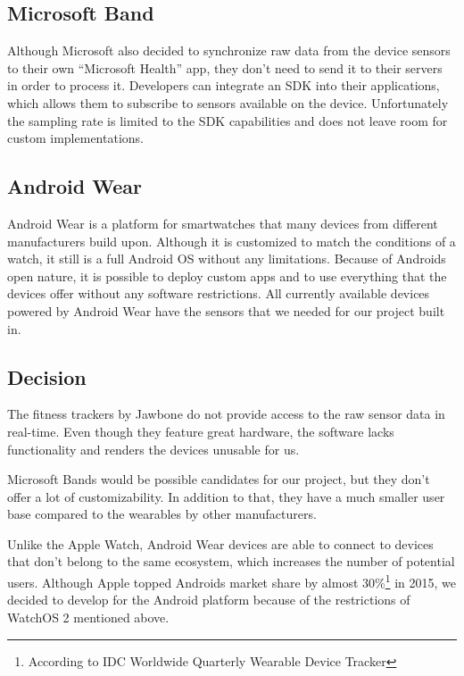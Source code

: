 \subsection{Microsoft Band}
Although Microsoft also decided to synchronize raw data from the device sensors to their own ``Microsoft Health'' app, they don't need to send it to their servers in order to process it.
Developers can integrate an SDK into their applications, which allows them to subscribe to sensors available on the device.
Unfortunately the sampling rate is limited to the SDK capabilities and does not leave room for custom implementations.

\clearpage

\subsection{Android Wear}
Android Wear is a platform for smartwatches that many devices from different manufacturers build upon.
Although it is customized to match the conditions of a watch, it still is a full Android OS without any limitations.
Because of Androids open nature, it is possible to deploy custom apps and to use everything that the devices offer without any software restrictions.
All currently available devices powered by Android Wear have the sensors that we needed for our project built in.

\subsection{Decision}

The fitness trackers by Jawbone do not provide access to the raw sensor data in real-time.
Even though they feature great hardware, the software lacks functionality and renders the devices unusable for us.

Microsoft Bands would be possible candidates for our project, but they don't offer a lot of customizability.
In addition to that, they have a much smaller user base compared to the wearables by other manufacturers.

Unlike the Apple Watch, Android Wear devices are able to connect to devices that don't belong to the same ecosystem, which increases the number of potential users. Although Apple topped Androids market share by almost 30\%\footnote{According to IDC Worldwide Quarterly Wearable Device Tracker} in 2015, we decided to develop for the Android platform because of the restrictions of WatchOS 2 mentioned above.

\clearpage